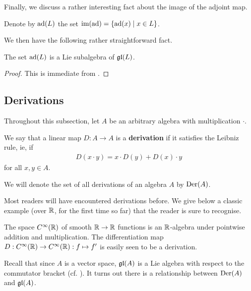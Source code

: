 Finally, we discuss a rather interesting fact about the image of the adjoint map.

\begin{boxconvention}
    Denote by $\operatorname{ad}\!\left( L \right)$ the set $\operatorname{im}\!\left( \operatorname{ad} \right) = \left\{ \operatorname{ad}\!\left( x \right) \; \middle\vert \; x \in L \right\}$.
\end{boxconvention}

We then have the following rather straightforward fact.

\begin{boxlemma}
    The set $\operatorname{ad}\!\left( L \right)$ is a Lie subalgebra of $\mathfrak{gl}\!\left( L \right)$.
\end{boxlemma}
\begin{proof}
    This is immediate from .
\end{proof}

\subsection{Derivations}

Throughout this subsection, let $A$ be an arbitrary algebra with multiplication $\cdot$.

\begin{boxdefinition}\label{Ch1:Def:Derivation}
    We say that a linear map $D : A \to A$ is a \textbf{derivation} if it satisfies the Leibniz rule, ie, if
    \begin{align}
        D(x \cdot y) = x \cdot D(y) + D(x) \cdot y
        \label{Ch1:Eq:LeibnizRule}
    \end{align}
    for all $x, y \in A$.
\end{boxdefinition}
\begin{boxconvention}
    We will denote the set of all derivations of an algebra $A$ by $\operatorname{Der}\!\left( A \right)$.
\end{boxconvention}

Most readers will have encountered derivations before. We give below a classic example (over $\mathbb{R}$, for the first time so far) that the reader is sure to recognise.

\begin{boxexample}
    The space $C^{\infty}(\mathbb{R})$ of smooth $\mathbb{R} \to \mathbb{R}$ functions is an $\mathbb{R}$-algebra under pointwise addition and multiplication. The differentiation map $D : C^{\infty}(\mathbb{R}) \to C^{\infty}(\mathbb{R}) : f \mapsto f'$ is easily seen to be a derivation.
\end{boxexample}

Recall that since $A$ is a vector space, $\mathfrak{gl}\!\left( A \right)$ is a Lie algebra with respect to the commutator bracket (cf. ). It turns out there is a relationship between $\operatorname{Der}\!\left( A \right)$ and $\mathfrak{gl}\!\left( A \right)$.

